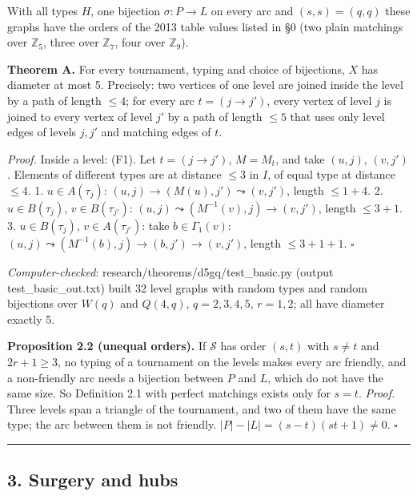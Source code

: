 \documentclass[
  11pt,
]{article}
\begin{document}
With all types \(H\), one bijection \(\sigma:P\to L\) on every arc and
\((s,s) = (q,q)\) these graphs have the orders of the 2013 table values
listed in §0 (two plain matchings over \(\mathbb Z_5\), three over
\(\mathbb Z_7\), four over \(\mathbb Z_9\)).

\textbf{Theorem A.} For every tournament, typing and choice of
bijections, \(X\) has diameter at most 5. Precisely: two vertices of one
level are joined inside the level by a path of length \(\le 4\); for
every arc \(t = (j\to j')\), every vertex of level \(j\) is joined to
every vertex of level \(j'\) by a path of length \(\le 5\) that uses
only level edges of levels \(j,j'\) and matching edges of \(t\).

\emph{Proof.} Inside a level: (F1). Let \(t = (j\to j')\), \(M = M_t\),
and take \((u,j)\), \((v,j')\). Elements of different types are at
distance \(\le 3\) in \(I\), of equal type at distance \(\le 4\). 1.
\(u\in A(\tau_j)\): \((u,j)\to(M(u),j')\leadsto(v,j')\), length
\(\le 1+4\). 2. \(u\in B(\tau_j)\), \(v\in B(\tau_{j'})\):
\((u,j)\leadsto(M^{-1}(v),j)\to(v,j')\), length \(\le 3+1\). 3.
\(u\in B(\tau_j)\), \(v\in A(\tau_{j'})\): take \(b\in\Gamma_1(v)\):
\((u,j)\leadsto(M^{-1}(b),j)\to(b,j')\to(v,j')\), length \(\le 3+1+1\).
\(\square\)

\emph{Computer-checked}: research/theorems/d5gq/test\_basic.py (output
test\_basic\_out.txt) built 32 level graphs with random types and random
bijections over \(W(q)\) and \(Q(4,q)\), \(q = 2,3,4,5\), \(r = 1,2\);
all have diameter exactly 5.

\textbf{Proposition 2.2 (unequal orders).} If \(\mathcal S\) has order
\((s,t)\) with \(s\ne t\) and \(2r+1\ge 3\), no typing of a tournament
on the levels makes every arc friendly, and a non-friendly arc needs a
bijection between \(P\) and \(L\), which do not have the same size. So
Definition 2.1 with perfect matchings exists only for \(s = t\).
\emph{Proof.} Three levels span a triangle of the tournament, and two of
them have the same type; the arc between them is not friendly.
\(|P|-|L| = (s-t)(st+1)\ne 0\). \(\square\)

\begin{center}\rule{0.5\linewidth}{0.5pt}\end{center}

\hypertarget{surgery-and-hubs}{%
\subsection{3. Surgery and hubs}\label{surgery-and-hubs}}
\end{document}
